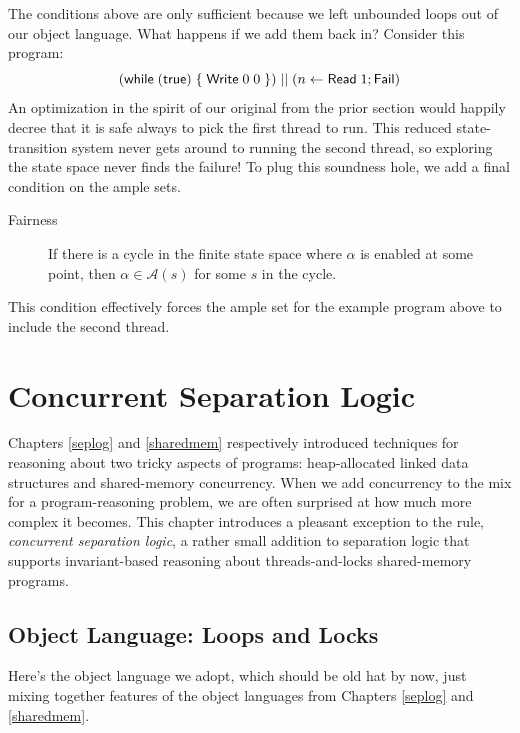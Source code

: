 \documentclass{amsbook}
\theoremstyle{definition}
\theoremstyle{remark}
\numberwithin{section}{chapter}
\numberwithin{equation}{chapter}
\begin{document}
The conditions above are only sufficient because we left unbounded loops out of our object language.
What happens if we add them back in?
Consider this program:
$$(\mathsf{while} \; (\mathsf{true}) \; \{ \; \mathsf{Write} \; 0 \; 0 \; \}) \; || \; (n \leftarrow \mathsf{Read} \; 1; \mathsf{Fail})$$
An optimization in the spirit of our original from the prior section would happily decree that it is safe always to pick the first thread to run.
This reduced state-transition system never gets around to running the second thread, so exploring the state space never finds the failure!
To plug this soundness hole, we add a final condition on the ample sets.

\begin{description}
  \item[Fairness] If there is a cycle in the finite state space where $\alpha$ is enabled at some point, then $\alpha \in \mathcal A(s)$ for some $s$ in the cycle.
\end{description}

This condition effectively forces the ample set for the example program above to include the second thread.



\chapter{Concurrent Separation Logic}

Chapters \ref{seplog} and \ref{sharedmem} respectively introduced techniques for reasoning about two tricky aspects of programs: heap-allocated linked data structures and shared-memory concurrency.
When we add concurrency to the mix for a program-reasoning problem, we are often surprised at how much more complex it becomes.
This chapter introduces a pleasant exception to the rule, \emph{concurrent separation logic}, a rather small addition to separation logic that supports invariant-based reasoning about threads-and-locks shared-memory programs.

\section{Object Language: Loops and Locks}

Here's the object language we adopt, which should be old hat by now, just mixing together features of the object languages from Chapters \ref{seplog} and \ref{sharedmem}.
\end{document}
